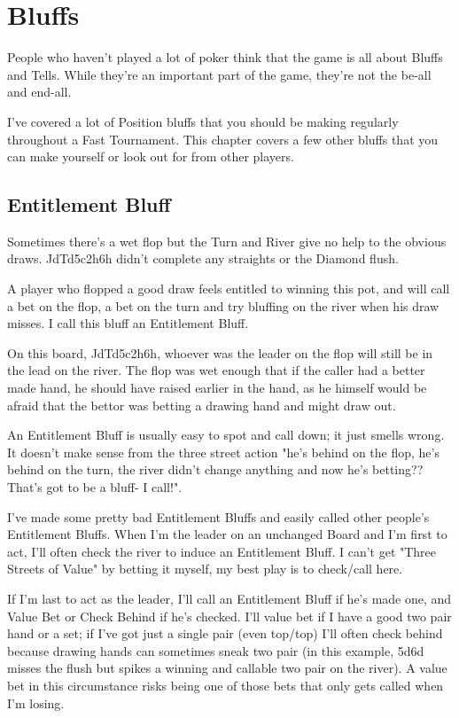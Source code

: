 \chapter{Bluffs}


People who haven't played a lot of poker think that the game
is all about Bluffs and Tells. While they're an important
part of the game, they're not the be-all and end-all.

I've covered a lot of Position bluffs that you should be making
regularly throughout a Fast Tournament. This chapter covers
a few other bluffs that you can make yourself or look out for
from other players.

\section{Entitlement Bluff}

Sometimes there's a wet flop but the Turn and River give no help
to the obvious draws. JdTd5c2h6h didn't complete any straights
or the Diamond flush.


A player who flopped a good draw feels entitled to winning
this pot, and will call a bet on the flop, a bet on the turn
and try bluffing on the river when his draw misses. I call
this bluff an Entitlement Bluff.

On this board, JdTd5c2h6h, whoever was the leader on the flop
will still be in the lead on the river. The flop was wet enough
that if the caller had a better made hand, he should have raised
earlier in the hand, as he himself would be afraid that the bettor
was betting a drawing hand and might draw out.

An Entitlement Bluff is usually easy to spot and call down; it
just smells wrong. It doesn't make sense from the three street action
"he's behind on the flop, he's behind on the turn, the river
didn't change anything and now he's betting?? That's got to be
a bluff- I call!".

I've made some pretty bad Entitlement Bluffs and easily called
other people's Entitlement Bluffs. When I'm the leader on
an unchanged Board and I'm first to act, I'll often check the
river to induce an Entitlement Bluff. I can't get "Three Streets
of Value" by betting it myself, my best play is to check/call here.

If I'm last to act as the leader, I'll call an Entitlement Bluff
if he's made one, and Value Bet or Check Behind if he's checked.
I'll value bet if I have a good two pair hand or a set; if I've
got just a single pair (even top/top) I'll often check behind
because drawing hands can sometimes sneak two pair (in this example,
5d6d misses the flush but spikes a winning and callable two pair
on the river). A value bet in this circumstance risks being one
of those bets that only gets called when I'm losing.


